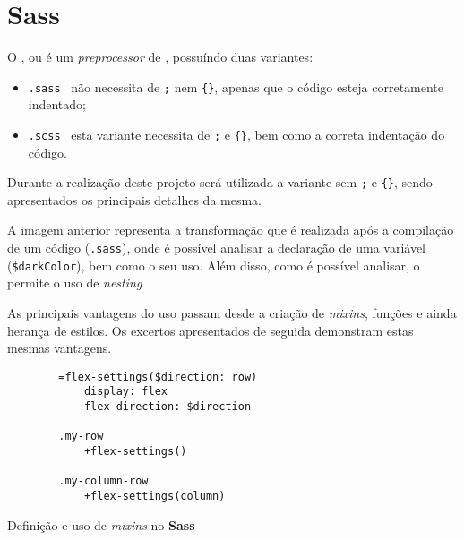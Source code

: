 \section{Sass}

\begin{minipage}{.3\textwidth}
\end{minipage}
\begin{minipage}{.7\textwidth}
	\minipagerestore
	O \textbf{}, ou \underline{} é um \textit{preprocessor} de \textbf{}, possuíndo duas variantes:

	\begin{itemize}
		\item \texttt{.sass} \textemdash~não necessita de \texttt{;} nem \verb|{}|, apenas que o código esteja corretamente indentado;
		\item \texttt{.scss} \textemdash~esta variante necessita de \texttt{;} e \verb|{}|, bem como a correta indentação do código.
	\end{itemize}
\end{minipage}

Durante a realização deste projeto será utilizada a variante sem \texttt{;} e \verb|{}|, sendo apresentados os principais detalhes da mesma.


A imagem anterior representa a transformação que é realizada após a compilação de um código \textbf{} (\texttt{.sass}), onde é possível analisar a declaração de uma variável (\verb|$darkColor|), bem como o seu uso. Além disso, como é possível analisar, o \textbf{} permite o uso de \textit{nesting} %


As principais vantagens do uso \textbf{} passam desde a criação de \textit{mixins}, funções e ainda herança de estilos. Os excertos apresentados de seguida demonstram estas mesmas vantagens.

\begin{longlisting}
	\begin{verbatim}
		=flex-settings($direction: row)
			display: flex
			flex-direction: $direction

		.my-row
			+flex-settings()

		.my-column-row
			+flex-settings(column)
	\end{verbatim}
	\caption{Definição e uso de \textit{mixins} no \textbf{Sass}}
\end{longlisting}